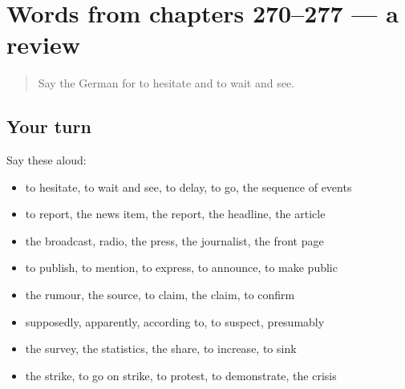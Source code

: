 \section[(dialogue)]{Words from chapters 270–277 — a review}

\label{lesson:GE-R277-review-270-277}



\begin{quote}
Say the German for to hesitate and to wait and see.
\end{quote}

\subsection*{Your turn}
Say these aloud:

\begin{itemize}
\raggedright
  \item to hesitate, to wait and see, to delay, to go, the sequence of events
  \item to report, the news item, the report, the headline, the article
  \item the broadcast, radio, the press, the journalist, the front page
  \item to publish, to mention, to express, to announce, to make public
  \item the rumour, the source, to claim, the claim, to confirm
  \item supposedly, apparently, according to, to suspect, presumably
  \item the survey, the statistics, the share, to increase, to sink
  \item the strike, to go on strike, to protest, to demonstrate, the crisis
\end{itemize}

